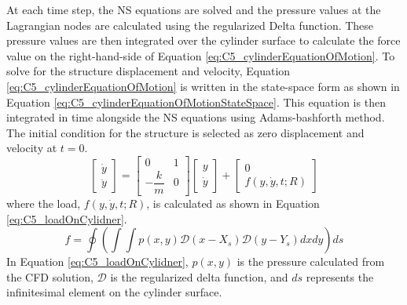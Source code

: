 At each time step, the NS equations are solved and the pressure values at the Lagrangian nodes are calculated using the regularized Delta function. These pressure values are then integrated over the cylinder surface to calculate the force value on the right-hand-side of Equation \eqref{eq:C5_cylinderEquationOfMotion}. To solve for the structure displacement and velocity, Equation \eqref{eq:C5_cylinderEquationOfMotion} is written in the state-space form as shown in Equation \eqref{eq:C5_cylinderEquationOfMotionStateSpace}. This equation is then integrated in time alongside the NS equations using Adams-bashforth method. The initial condition for the structure is selected as zero displacement and velocity at $t = 0$.
%
\begin{equation}\label{eq:C5_cylinderEquationOfMotionStateSpace}
	\begin{bmatrix}
	\dot{y} \\
	\ddot{y}
	\end{bmatrix} = 
	\begin{bmatrix}
	0 & 1 \\
	-\dfrac{k}{m} & 0
	\end{bmatrix}
	\begin{bmatrix}
	y \\
	\dot{y}
	\end{bmatrix} + 
	\begin{bmatrix}
	0 \\
	f(y, \dot{y}, t; R)
	\end{bmatrix}
\end{equation}
%
where the load, $f(y, \dot{y}, t; R)$, is calculated  as shown in Equation \eqref{eq:C5_loadOnCylidner}.
%
\begin{equation}\label{eq:C5_loadOnCylidner}
	f = \oint \left( \int \int p(x, y) \mathcal{D}(x - X_s) \mathcal{D}(y - Y_s) dx dy\right) ds
\end{equation}
%
In Equation \eqref{eq:C5_loadOnCylidner}, $p(x, y)$ is the pressure calculated from the CFD solution, $\mathcal{D}$ is the regularized delta function, and $ds$ represents the infinitesimal element on the cylinder surface.

